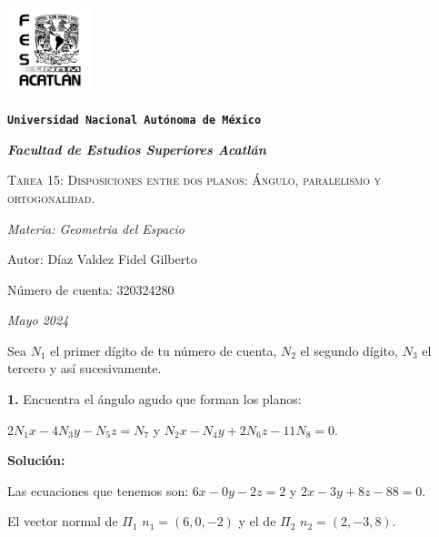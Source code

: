 \documentclass{article}
\begin{document}
\begin{titlepage}
   \centering  
   {\includegraphics[width=2.5cm]{logo.png}\par}
   {\texttt{\bfseries \LARGE Universidad Nacional Autónoma de México} \par}
   \vspace{1cm}
   {\itshape \Large \bfseries Facultad de Estudios Superiores Acatlán \par}
   \vspace{3cm}
   {\scshape \Huge Tarea 15: Disposiciones entre dos planos: Ángulo, paralelismo y ortogonalidad.\par}
   \vspace {3cm}
   {\slshape \Large Materia: Geometria del Espacio \par}
   \vspace{2cm}
   {\Large Autor: Díaz Valdez Fidel Gilberto\par}
   {\Large Número de cuenta: 320324280\par}
   \vfill
   {\itshape Mayo 2024 \par}
\end{titlepage}
Sea $N_1$ el primer dígito de tu número de cuenta, $N_2$ el segundo dígito, $N_3$ el tercero y así
sucesivamente.
\vspace{10pt}


\textbf{1.} Encuentra el ángulo agudo que forman los planos:
\vspace{10pt}
\begin{center}
   \begin{minipage}[c]{10cm}
       $2N_1x-4N_3y-N_5z=N_7$ y $N_2x-N_4y+2N_6z-11N_8 =0$.
   \end{minipage}   
\end{center}
\vspace{10pt}


\textbf{Solución:}
\vspace{10pt}


Las ecuaciones que tenemos son: $6x-0y-2z=2$ y $2x-3y+8z-88=0$.


El vector normal de $\Pi_1$ $n_1=(6,0,-2)$ y el de $\Pi_2$ $n_2=(2,-3,8)$.
\vspace*{10pt}
\end{document}
